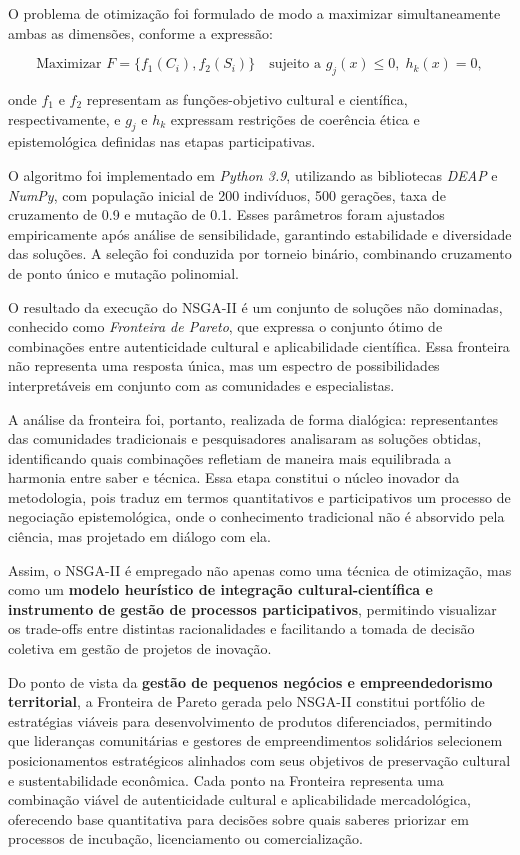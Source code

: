 O problema de otimização foi formulado de modo a maximizar simultaneamente ambas as dimensões, conforme a expressão:

\[
\text{Maximizar } F = \{ f_1(C_i), f_2(S_i) \} \quad \text{sujeito a } g_j(x) \leq 0, \; h_k(x) = 0,
\]

onde $f_1$ e $f_2$ representam as funções-objetivo cultural e científica, respectivamente, e $g_j$ e $h_k$ expressam restrições de coerência ética e epistemológica definidas nas etapas participativas. 

O algoritmo foi implementado em \textit{Python 3.9}, utilizando as bibliotecas \textit{DEAP} e \textit{NumPy}, com população inicial de 200 indivíduos, 500 gerações, taxa de cruzamento de 0.9 e mutação de 0.1. Esses parâmetros foram ajustados empiricamente após análise de sensibilidade, garantindo estabilidade e diversidade das soluções. A seleção foi conduzida por torneio binário, combinando cruzamento de ponto único e mutação polinomial. 

O resultado da execução do NSGA-II é um conjunto de soluções não dominadas, conhecido como \textit{Fronteira de Pareto}, que expressa o conjunto ótimo de combinações entre autenticidade cultural e aplicabilidade científica. Essa fronteira não representa uma resposta única, mas um espectro de possibilidades interpretáveis em conjunto com as comunidades e especialistas. 

A análise da fronteira foi, portanto, realizada de forma dialógica: representantes das comunidades tradicionais e pesquisadores analisaram as soluções obtidas, identificando quais combinações refletiam de maneira mais equilibrada a harmonia entre saber e técnica. Essa etapa constitui o núcleo inovador da metodologia, pois traduz em termos quantitativos e participativos um processo de negociação epistemológica, onde o conhecimento tradicional não é absorvido pela ciência, mas projetado em diálogo com ela.

Assim, o NSGA-II é empregado não apenas como uma técnica de otimização, mas como um \textbf{modelo heurístico de integração cultural-científica e instrumento de gestão de processos participativos}, permitindo visualizar os trade-offs entre distintas racionalidades e facilitando a tomada de decisão coletiva em gestão de projetos de inovação.

Do ponto de vista da \textbf{gestão de pequenos negócios e empreendedorismo territorial}, a Fronteira de Pareto gerada pelo NSGA-II constitui portfólio de estratégias viáveis para desenvolvimento de produtos diferenciados, permitindo que lideranças comunitárias e gestores de empreendimentos solidários selecionem posicionamentos estratégicos alinhados com seus objetivos de preservação cultural e sustentabilidade econômica. Cada ponto na Fronteira representa uma combinação viável de autenticidade cultural e aplicabilidade mercadológica, oferecendo base quantitativa para decisões sobre quais saberes priorizar em processos de incubação, licenciamento ou comercialização.

